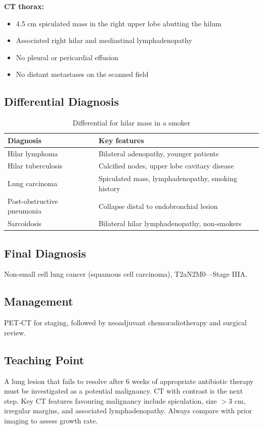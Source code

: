 \textbf{CT thorax:}
\begin{itemize}
    \item 4.5 cm spiculated mass in the right upper lobe abutting the hilum
    \item Associated right hilar and mediastinal lymphadenopathy
    \item No pleural or pericardial effusion
    \item No distant metastases on the scanned field
\end{itemize}

\subsection{Differential Diagnosis}
\begin{table}[h]
\centering
\caption{Differential for hilar mass in a smoker}
\begin{tabular}{|p{}|p{}|}
\hline
\textbf{Diagnosis} & \textbf{Key features} \\
\hline
Hilar lymphoma & Bilateral adenopathy, younger patients \\
\hline
Hilar tuberculosis & Calcified nodes, upper lobe cavitary disease \\
\hline
Lung carcinoma & Spiculated mass, lymphadenopathy, smoking history \\
\hline
Post-obstructive pneumonia & Collapse distal to endobronchial lesion \\
\hline
Sarcoidosis & Bilateral hilar lymphadenopathy, non-smokers \\
\hline
\end{tabular}
\end{table}

\subsection{Final Diagnosis}
Non-small cell lung cancer (squamous cell carcinoma), T2aN2M0---Stage IIIA.

\subsection{Management}
PET-CT for staging, followed by neoadjuvant chemoradiotherapy and surgical review.

\subsection{Teaching Point}
A lung lesion that fails to resolve after 6 weeks of appropriate antibiotic therapy must be investigated as a potential malignancy. CT with contrast is the next step. Key CT features favouring malignancy include spiculation, size $>3$ cm, irregular margins, and associated lymphadenopathy. Always compare with prior imaging to assess growth rate.

